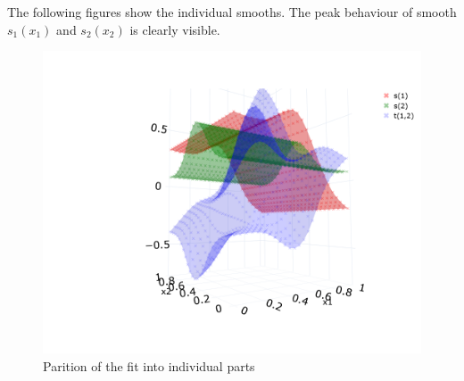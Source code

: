 \documentclass[10pt,a4paper]{article}
\begin{document}
	The following figures show the individual smooths. The peak behaviour of smooth $s_1(x_1)$ and $s_2(x_2)$ is clearly visible.

	\begin{figure}[H]
		\centering
		\includegraphics[width=\linewidth]{thesisplots/2d_function_partition.png}
		\caption{Parition of the fit into individual parts}
		\label{fig:2dtestf_parition}
	\end{figure}

	
	
\end{document}
